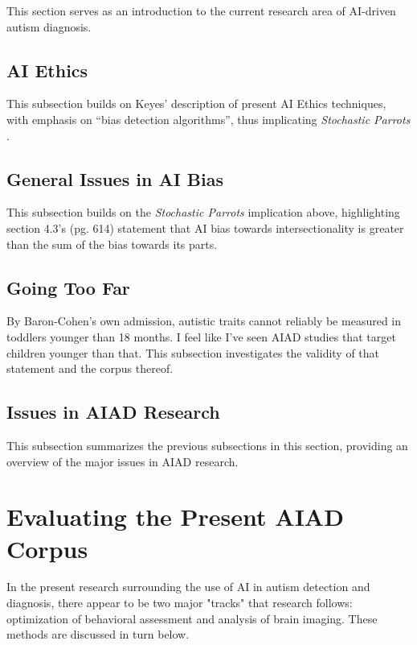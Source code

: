 \documentclass[letterpaper]{article}
\begin{document}
This section serves as an introduction to the current research area of AI-driven autism diagnosis.

\subsection{AI Ethics}
This subsection builds on Keyes' \cite{auto} description of present AI Ethics techniques, with emphasis on “bias detection algorithms”, thus implicating \textit{Stochastic Parrots} \cite{stopar}.

\subsection{General Issues in AI Bias}
This subsection builds on the \textit{Stochastic Parrots} \cite{stopar} implication above, highlighting section 4.3's (pg. 614) statement that AI bias towards intersectionality is greater than the sum of the bias towards its parts.

\subsection{Going Too Far}
By Baron-Cohen's own admission, autistic traits cannot reliably be measured in toddlers younger than 18 months. I feel like I've seen AIAD studies that target children younger than that. This subsection investigates the validity of that statement and the corpus thereof.

\subsection{Issues in AIAD Research}
This subsection summarizes the previous subsections in this section, providing an overview of the major issues in AIAD research. 

\section{Evaluating the Present AIAD Corpus}
In the present research surrounding the use of AI in autism detection and diagnosis, there appear to be two major "tracks" that research follows: optimization of behavioral assessment and analysis of brain imaging. These methods are discussed in turn below.
\end{document}
